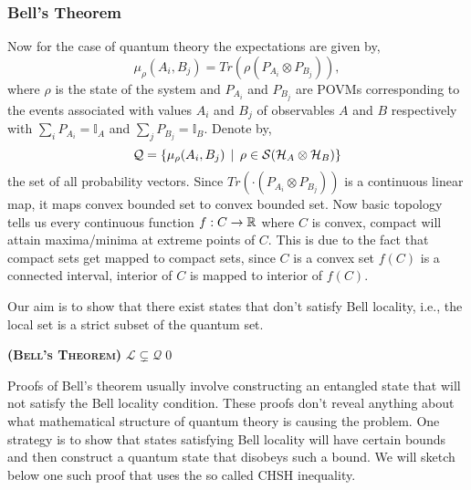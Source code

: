 \documentclass[11pt]{report}
\begin{document}
\subsubsection{{Bell's Theorem}}
Now for the case of quantum theory the expectations are given by,
$$\mu_{\rho}(A_i,B_j)=Tr(\rho (P_{A_i}\otimes P_{B_j})),$$
where $\rho$ is the state of the system and $P_{A_i}$ and $P_{B_j}$ are POVMs corresponding to the events associated with values $A_i$ and $B_j$ of observables $A$ and $B$ respectively with $\sum_i P_{A_i}=\mathbb{I}_A$ and $\sum_j P_{B_j}=\mathbb{I}_B$. Denote by,
$$\mathcal{Q}=\{\mu_\rho(A_i,B_j)\:\:|\:\:\rho\in \mathcal{S}(\mathcal {H}_A\otimes \mathcal {H}_B)\}$$
the set of all probability vectors. Since $Tr(\cdot (P_{A_i}\otimes P_{B_j}))$ is a continuous linear map, it maps convex bounded set to convex bounded set. Now basic topology tells us every continuous function $f:C\to \mathbb{R}$ where $C$ is convex, compact will attain maxima/minima at extreme points of $C$. This is due to the fact that compact sets get mapped to compact sets, since $C$ is a convex set $f(C)$ is a connected interval, interior of $C$ is mapped to interior of $f(C)$. 

Our aim is to show that there exist states that don't satisfy Bell locality, i.e., the local set is a strict subset of the quantum set.

\vspace{1em}
\begin{theorem}
	{\bfseries \textsc{(Bell's Theorem)}} $\mathcal{L} \subsetneq \mathcal{Q}$\qed
\end{theorem}
\vspace{1em}

Proofs of Bell's theorem usually involve constructing an entangled state that will not satisfy the Bell locality condition. These proofs don't reveal anything about what mathematical structure of quantum theory is causing the problem. One strategy is to show that states satisfying Bell locality will have certain bounds and then construct a quantum state that disobeys such a bound. We will sketch below one such proof that uses the so called CHSH inequality.
\end{document}
